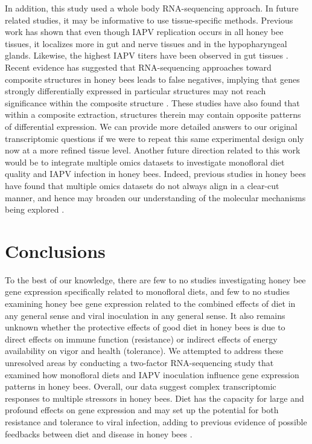 \documentclass{bmcart}
\begin{document}
\begin{linenumbers}
\begin{doublespacing}
In addition, this study used a whole body RNA-sequencing approach. In future related studies, it may be informative to use tissue-specific methods. Previous work has shown that even though IAPV replication occurs in all honey bee tissues, it localizes more in gut and nerve tissues and in the hypopharyngeal glands. Likewise, the highest IAPV titers have been observed in gut tissues \cite{winter}. Recent evidence has suggested that RNA-sequencing approaches toward composite structures in honey bees leads to false negatives, implying that genes strongly differentially expressed in particular structures may not reach significance within the composite structure \cite{tissueLevel}. These studies have also found that within a composite extraction, structures therein may contain opposite patterns of differential expression. We can provide more detailed answers to our original transcriptomic questions if we were to repeat this same experimental design only now at a more refined tissue level. Another future direction related to this work would be to integrate multiple omics datasets to investigate monofloral diet quality and IAPV infection in honey bees. Indeed, previous studies in honey bees have found that multiple omics datasets do not always align in a clear-cut manner, and hence may broaden our understanding of the molecular mechanisms being explored \cite{galbraith}.

\section*{Conclusions}

To the best of our knowledge, there are few to no studies investigating honey bee gene expression specifically related to monofloral diets, and few to no studies examining honey bee gene expression related to the combined effects of diet in any general sense and viral inoculation in any general sense. It also remains unknown whether the protective effects of good diet in honey bees is due to direct effects on immune function (resistance) or indirect effects of energy availability on vigor and health (tolerance). We attempted to address these unresolved areas by conducting a two-factor RNA-sequencing study that examined how monofloral diets and IAPV inoculation influence gene expression patterns in honey bees. Overall, our data suggest complex transcriptomic responses to multiple stressors in honey bees. Diet has the capacity for large and profound effects on gene expression and may set up the potential for both resistance and tolerance to viral infection, adding to previous evidence of possible feedbacks between diet and disease in honey bees \cite{AdamTothReview}. 


\end{doublespacing}
\end{linenumbers}
\end{document}
